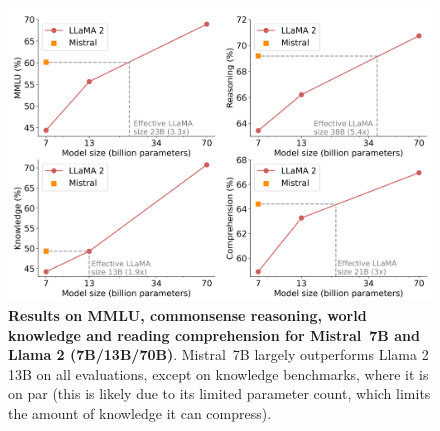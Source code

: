 \documentclass{article}
\def\llama{Llama\xspace}
\def\mistral{Mistral~7B\xspace}
\begin{document}
\begin{figure}
\centering
\includegraphics[width=0.7\linewidth,height=\textheight,keepaspectratio]{images/230927_effective_sizes.png}
\caption{\small \textbf{Results on MMLU, commonsense reasoning, world knowledge and reading comprehension for \mistral and \llama 2 (7B/13B/70B)}. \mistral largely outperforms \llama 2 13B on all evaluations, except on knowledge benchmarks, where it is on par (this is likely due to its limited parameter count, which limits the amount of knowledge it can compress).}
\label{fig:size}
\end{figure}
\end{document}
